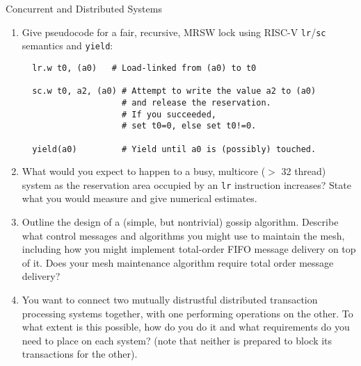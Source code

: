 \documentclass{tripos}
\begin{document}
\begin{question}[MockIB,year=2025,paper=2,question=1,author=rrw]{Concurrent and Distributed Systems}

\begin{enumerate}
\item Give pseudocode for a fair, recursive, MRSW lock using RISC-V \verb|lr|/\verb|sc| semantics and \verb|yield|:

\begin{verbatim}
  lr.w t0, (a0)   # Load-linked from (a0) to t0

  sc.w t0, a2, (a0) # Attempt to write the value a2 to (a0)
                    # and release the reservation.
                    # If you succeeded,
                    # set t0=0, else set t0!=0.

  yield(a0)         # Yield until a0 is (possibly) touched.

\end{verbatim}

\item What would you expect to happen to a busy, multicore ($>$ 32
  thread) system as the reservation area occupied by an \verb|lr|
  instruction increases? State what you would measure and give
  numerical estimates.  

\item Outline the design of a (simple, but nontrivial) gossip algorithm. Describe what control messages and algorithms you might use to maintain the mesh, including how you might implement total-order FIFO message delivery on top of it. Does your mesh maintenance algorithm require total order message delivery? 

\item You want to connect two mutually distrustful distributed transaction processing systems together, with one performing operations on the other. To what extent is this possible, how do you do it and what requirements do you need to place on each system? (note that neither is prepared to block its transactions for the other). 

 \end{enumerate}
\end{question}
\end{document}
